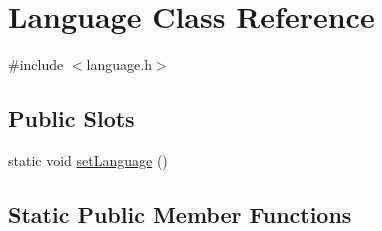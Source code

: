 \hypertarget{class_language}{}\section{Language Class Reference}
\label{class_language}


{\ttfamily \#include $<$language.\+h$>$}

\subsection*{Public Slots}
\begin{DoxyCompactItemize}
\item 
static void \hyperlink{class_language_a1be8a8900bc2e8511f68cdadb460fa65}{set\+Language} ()
\end{DoxyCompactItemize}
\subsection*{Static Public Member Functions}
